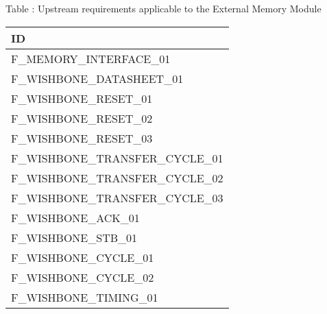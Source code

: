 {
  \vspace{0.5em}
  \begin{center}
    Table \thetable: Upstream requirements applicable to the External Memory Module\label{tab:emm-upstream-requirements}
  \end{center}

\footnotesize
\begin{xltabular}{0.9\textwidth}{|X|}
  \hline
  \textbf{ID} \\
  \hline
  F\_MEMORY\_INTERFACE\_01 \\
  \hline
  F\_WISHBONE\_DATASHEET\_01 \\
  \hline
  F\_WISHBONE\_RESET\_01 \\
  \hline
  F\_WISHBONE\_RESET\_02 \\
  \hline
  F\_WISHBONE\_RESET\_03 \\
  \hline
  F\_WISHBONE\_TRANSFER\_CYCLE\_01 \\
  \hline
  F\_WISHBONE\_TRANSFER\_CYCLE\_02 \\
  \hline
  F\_WISHBONE\_TRANSFER\_CYCLE\_03 \\
  \hline
  F\_WISHBONE\_ACK\_01 \\
  \hline
  F\_WISHBONE\_STB\_01 \\
  \hline
  F\_WISHBONE\_CYCLE\_01 \\
  \hline
  F\_WISHBONE\_CYCLE\_02 \\
  \hline
  F\_WISHBONE\_TIMING\_01 \\
  \hline
\end{xltabular}
}
